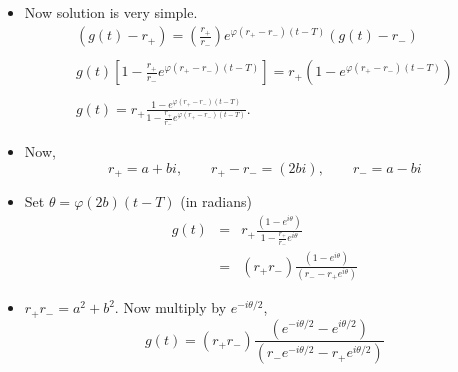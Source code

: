 \documentclass[12pt,compress,handout]{beamer}  %
\begin{document}
\begin{frame}
\begin{itemize}[<+->]
\item
Now solution is very simple.\\[5mm]
\begin{gather*}
(g(t)-r_{+})=\left( \frac{r_{+}}{r_{-}}\right) e^{\varphi
(r_{+}-r_{-})(t-T)}(g(t)-r_{-}) \\
\\
g(t)\left[ 1-\frac{r_{+}}{r_{-}}e^{\varphi (r_{+}-r_{-})(t-T)}\right]
=r_{+}(1-e^{\varphi (r_{+}-r_{-})(t-T)}) \\
\\
g(t)=r_{+}\frac{1-e^{\varphi
(r_{+}-r_{-})(t-T)}}{1-\frac{r_{+}}{r_{-}}e^{\varphi (r_{+}-r_{-})(t-T)}}.
\end{gather*}
\end{itemize}
\end{frame}


\begin{frame}
\begin{itemize}[<+->]
\item Now,
\begin{equation*}
r_{+}=a+bi, \qquad r_{+}-r_{-}=(2bi), \qquad r_{-} = a - bi
\end{equation*}

\item Set $\theta =\varphi (2b)(t-T)$ (in radians)
\begin{eqnarray*}
g(t) &=&r_{+}\frac{(1-e^{i\theta })}{1-\frac{r_{+}}{r_{-}}e^{i\theta }} \\
&=&(r_{+}r_{-})\frac{(1-e^{i\theta })}{(r_{-}-r_{+}e^{i\theta })}
\end{eqnarray*}

\item $r_{+}r_{-}=a^2+b^2$. Now multiply by $e^{-i\theta /2}$,
\begin{equation*}
g(t)=(r_{+}r_{-})\frac{(e^{-i\theta /2}-e^{i\theta
/2})}{(r_{-}e^{-i\theta /2}-r_{+}e^{i\theta /2})}
\end{equation*}
\end{itemize}
\end{frame}
\end{document}
